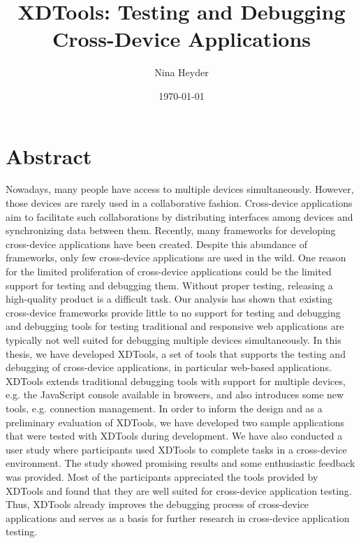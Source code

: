 \documentclass[11pt,a4paper]{globis-book}
\title{XDTools: Testing and Debugging Cross-Device Applications}
\author{Nina Heyder}
\institute{Institute of Information Systems}
\date{\today}
\begin{document}
\frontmatter
\maketitlepage
\cleardoublepage
{}

\chapter*{Abstract}

Nowadays, many people have access to multiple devices simultaneously. However, those devices are rarely used in a collaborative fashion. Cross-device applications aim to facilitate such collaborations by distributing interfaces among devices and synchronizing data between them. Recently, many frameworks for developing cross-device applications have been created. Despite this abundance of frameworks, only few cross-device applications are used in the wild. One reason for the limited proliferation of cross-device applications could be the limited support for testing and debugging them. Without proper testing, releasing a high-quality product is a difficult task. Our analysis has shown that existing cross-device frameworks provide little to no support for testing and debugging and debugging tools for testing traditional and responsive web applications are typically not well suited for debugging multiple devices simultaneously. In this thesis, we have developed XDTools, a set of tools that supports the testing and debugging of cross-device applications, in particular web-based applications. XDTools extends traditional debugging tools with support for multiple devices, e.g. the JavaScript console available in browsers, and also introduces some new tools, e.g. connection management. In order to inform the design and as a preliminary evaluation of XDTools, we have developed two sample applications that were tested with XDTools during development. We have also conducted a user study where participants used XDTools to complete tasks in a cross-device environment. The study showed promising results and some enthusiastic feedback was provided. Most of the participants appreciated the tools provided by XDTools and found that they are well suited for cross-device application testing. Thus, XDTools already improves the debugging process of cross-device applications and serves as a basis for further research in cross-device application testing.

\tableofcontents

\mainmatter









\end{document}
